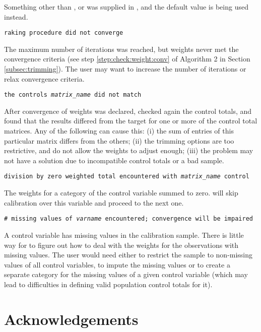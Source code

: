     \morehang
    Something other than ,  or  was supplied
    in , and the default value is being used instead.

    \noindent
    {\tt raking procedure did not converge}

    \morehang
    The maximum number of iterations was reached, but weights never met the convergence
    criteria (see step \ref{step:check:weight:conv} of Algorithm 2 in Section \ref{subsec:trimming}).
    The user may want to increase the number of iterations or relax convergence criteria.

    \noindent
    {\tt the controls {\it matrix{\_}name} did not match}

    \morehang
    After convergence of weights was declared, 
    checked again the control totals, and found that the results
    differed from the target for one or more of the control total
    matrices. Any of the following can cause this: (i) the sum of
    entries of this particular matrix differs from the others;
    (ii) the trimming options are too restrictive, and do not allow
    the weights to adjust enough; (iii) the problem may not have a
    solution due to incompatible control totals or a bad sample.

    \noindent
    {\tt division by zero weighted total encountered with
    {\it matrix{\_}name} control}

    \morehang
    The weights for a category of the control variable summed
    to zero.  will skip calibration over this
    variable and proceed to the next one.

    \noindent
    {\tt \# missing values of {\it varname} encountered; convergence will be impaired}

    \morehang
    A control variable has missing values in the calibration sample.
    There is little way for  to figure out how to deal
    with the weights for the observations with missing values. The user would need
    either to restrict the sample to non-missing values of all control variables,
    to impute the missing values or to create a separate category for the missing
    values of a given control variable (which may lead to difficulties in defining
    valid population control totals for it).

\section*{Acknowledgements}

